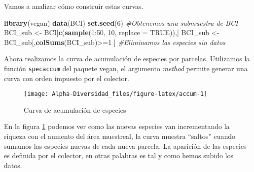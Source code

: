 \documentclass[]{book}
\newenvironment{Shaded}{\begin{snugshade}}{\end{snugshade}}
\newcommand{\KeywordTok}[1]{\textcolor[rgb]{0.13,0.29,0.53}{\textbf{{#1}}}}
\newcommand{\DataTypeTok}[1]{\textcolor[rgb]{0.13,0.29,0.53}{{#1}}}
\newcommand{\DecValTok}[1]{\textcolor[rgb]{0.00,0.00,0.81}{{#1}}}
\newcommand{\StringTok}[1]{\textcolor[rgb]{0.31,0.60,0.02}{{#1}}}
\newcommand{\CommentTok}[1]{\textcolor[rgb]{0.56,0.35,0.01}{\textit{{#1}}}}
\newcommand{\OtherTok}[1]{\textcolor[rgb]{0.56,0.35,0.01}{{#1}}}
\newcommand{\NormalTok}[1]{{#1}}
\begin{document}
Vamos a analizar cómo construir estas curvas.

\begin{Shaded}
\begin{Highlighting}[]
\KeywordTok{library}\NormalTok{(vegan)}
\KeywordTok{data}\NormalTok{(BCI)}
\KeywordTok{set.seed}\NormalTok{(}\DecValTok{6}\NormalTok{)}
\CommentTok{#Obtenemos una submuestra de BCI}
\NormalTok{BCI_sub <-}\StringTok{ }\NormalTok{BCI[}\KeywordTok{c}\NormalTok{(}\KeywordTok{sample}\NormalTok{(}\DecValTok{1}\NormalTok{:}\DecValTok{50}\NormalTok{, }\DecValTok{10}\NormalTok{, }\DataTypeTok{replace =} \OtherTok{TRUE}\NormalTok{)),]}
\NormalTok{BCI_sub <-}\StringTok{ }\NormalTok{BCI_sub[,}\KeywordTok{colSums}\NormalTok{(BCI_sub)>=}\DecValTok{1} \NormalTok{] }
\CommentTok{#Eliminamos las especies sin datos}
\end{Highlighting}
\end{Shaded}

Ahora realizamos la curva de acumulación de especies por parcelas.
Utilizamos la función \texttt{specaccum} del paquete vegan, el argumento
\emph{method} permite generar una curva con orden impuesto por el
colector.

\begin{Shaded}
\end{Shaded}

\begin{figure}

{\centering \texttt{[image: Alpha-Diversidad\_files/figure-latex/accum-1]} 

}

\caption{Curva de acumulación de especies}\label{fig:accum}
\end{figure}

En la figura \ref{fig:accum} podemos ver como las nuevas especies van
incrementando la riqueza con el aumento del área muestreal, la curva
muestra ``saltos'' cuando sumamos las especies nuevas de cada nueva
parcela. La aparición de las especies es definida por el colector, en
otras palabras es tal y como hemos subido los datos.
\end{document}

